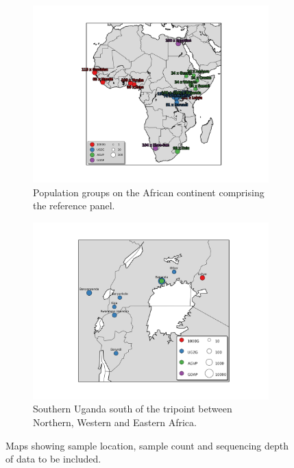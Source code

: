 \begin{figure}[htbp]
\centering
 \begin{subfigure}[b]{0.9\textwidth}
  \centering
  \includegraphics[width=0.9\linewidth]{ADRP/figures/Africa} \caption{Population groups on the African continent comprising the reference panel.}
 \end{subfigure}
 \begin{subfigure}[b]{0.9\textwidth}
  \centering
  \includegraphics[width=0.9\linewidth]{ADRP/figures/Uganda.jpg}
  \caption{Southern Uganda south of the tripoint between Northern, Western and Eastern Africa.}
 \end{subfigure}
\caption{Maps showing sample location, sample count and sequencing depth of data to be included.}
\label{fig:map}
\end{figure}



